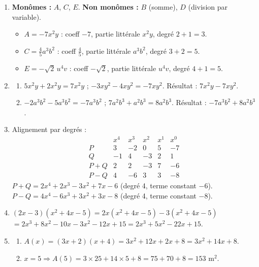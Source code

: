 \documentclass[11pt]{article}
\begin{document}
\begin{corrige}
\begin{enumerate}
    \item \textbf{Monômes :} $A$, $C$, $E$. \quad \textbf{Non monômes :} $B$ (somme), $D$ (division par variable).
    \begin{itemize}
        \item $A = -7x^2y$ : coeff $-7$, partie littérale $x^2y$, degré $2+1=3$.
        \item $C = \frac{4}{5}a^3b^2$ : coeff $\frac{4}{5}$, partie littérale $a^3b^2$, degré $3+2=5$.
        \item $E = -\sqrt{2}\,u^4v$ : coeff $-\sqrt{2}$, partie littérale $u^4v$, degré $4+1=5$.
    \end{itemize}
    \item \begin{enumerate}
        \item $5x^2y + 2x^2y = 7x^2y$ ; $-3xy^2 - 4xy^2 = -7xy^2$. Résultat : $\boxed{7x^2y - 7xy^2}$.
        \item $-2a^3b^2 - 5a^3b^2 = -7a^3b^2$ ; $7a^2b^3 + a^2b^3 = 8a^2b^3$. Résultat : $\boxed{-7a^3b^2 + 8a^2b^3}$.
    \end{enumerate}
    \item Alignement par degrés :
    \[
    \begin{array}{c|ccccc}
         & x^4 & x^3 & x^2 & x^1 & x^0 \\ \hline
    P & 3 & -2 & 0 & 5 & -7 \\
    Q & -1 & 4 & -3 & 2 & 1 \\ \hline
    P+Q & 2 & 2 & -3 & 7 & -6 \\
    P-Q & 4 & -6 & 3 & 3 & -8
    \end{array}
    \]
    $P+Q = 2x^4 + 2x^3 - 3x^2 + 7x - 6$ (degré 4, terme constant $-6$).
    $P-Q = 4x^4 - 6x^3 + 3x^2 + 3x - 8$ (degré 4, terme constant $-8$).
    \item $(2x-3)(x^2+4x-5) = 2x(x^2+4x-5) - 3(x^2+4x-5)$
    $= 2x^3+8x^2-10x - 3x^2-12x+15 = \boxed{2x^3 + 5x^2 - 22x + 15}$.
    \item \begin{enumerate}
        \item $A(x) = (3x+2)(x+4) = 3x^2 + 12x + 2x + 8 = \boxed{3x^2 + 14x + 8}$.
        \item $x=5 \Rightarrow A(5) = 3\times25 + 14\times5 + 8 = 75 + 70 + 8 = \boxed{153 \text{ m}^2}$.
    \end{enumerate}
\end{enumerate}
\end{corrige}
\end{document}
